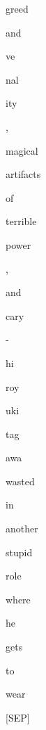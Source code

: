 \documentclass[varwidth=150mm]{standalone}
\begin{document}
\begin{CJK*}{UTF8}{gbsn}
{{{\colorbox{red!2.170936107635498}{\strut greed} \colorbox{red!1.2580552101135254}{\strut and} \colorbox{red!1.8397221565246582}{\strut ve}\colorbox{red!1.3515528440475464}{\strut nal}\colorbox{red!1.1959939002990723}{\strut ity} \colorbox{red!2.9896833896636963}{\strut ,} \colorbox{red!4.250288009643555}{\strut magical} \colorbox{red!1.1994426250457764}{\strut artifacts} \colorbox{red!0.0}{\strut of} \colorbox{red!1.1426706314086914}{\strut terrible} \colorbox{red!1.1699002981185913}{\strut power} \colorbox{red!0.0}{\strut ,} \colorbox{red!15.78237533569336}{\strut and} \colorbox{red!66.47637939453125}{\strut cary} \colorbox{red!3.6781058311462402}{\strut -} \colorbox{red!14.22776985168457}{\strut hi}\colorbox{red!17.632183074951172}{\strut roy}\colorbox{red!20.35982322692871}{\strut uki} \colorbox{red!10.447504997253418}{\strut tag}\colorbox{red!22.646162033081055}{\strut awa} \colorbox{red!1.8868056535720825}{\strut wasted} \colorbox{red!0.0}{\strut in} \colorbox{red!2.788841962814331}{\strut another} \colorbox{red!5.213193893432617}{\strut stupid} \colorbox{red!4.012918949127197}{\strut role} \colorbox{red!4.231161594390869}{\strut where} \colorbox{red!0.0}{\strut he} \colorbox{red!0.0}{\strut gets} \colorbox{red!0.0}{\strut to} \colorbox{red!0.0}{\strut wear} \colorbox{red!3.563498020172119}{\strut [SEP]}
}}}
\end{CJK*}
\end{document}
